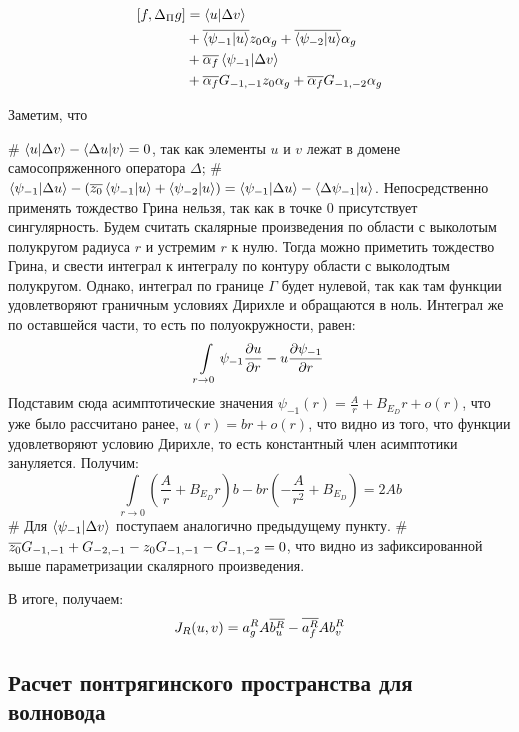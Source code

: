 \begin{align*}
\iip{f}{\Delta_\Pi  g}
&= \ip{u}{\Delta v} \\
&+ \cconj{\ip{\psi_{-1}}{u}} z_0 \alpha_g + \cconj{\ip{\psi_{-2}}{u}} \alpha_g \\
&+ \cconj{\alpha_f} \ip{\psi_{-1}}{\Delta v} \\
&+ \cconj{\alpha_f} G_{-1, -1} z_0 \alpha_g + \cconj{\alpha_f} G_{-1, -2} \alpha_g 
\end{align*}

Заметим, что
\begin{elist}
# $\ip{u}{\Delta v} - \ip{\Delta u}{v} = 0$, так как элементы $u$ и $v$ лежат в домене самосопряженного оператора $\Delta$;
# $\ip{\psi_{-1}}{\Delta u} - (\cconj{z_0} \ip{\psi_{-1}}{u} + \ip{\psi_{-2}}{u}) = \ip{\psi_{-1}}{\Delta u} - \ip{\Delta \psi_{-1}}{u}$. Непосредственно применять тождество Грина нельзя, так как в точке $0$ присутствует сингулярность. Будем считать скалярные произведения по области с выколотым полукругом радиуса $r$ и устремим $r$ к нулю. Тогда можно приметить тождество Грина, и свести интеграл к интегралу по контуру области с выколодтым полукругом. Однако, интеграл по границе $\Gamma$ будет нулевой, так как там функции удовлетворяют граничным условиях Дирихле и обращаются в ноль. Интеграл же по оставшейся части, то есть по полуокружности, равен: 
\[
\int\limits_{r \to 0} \psi_{-1} \pdv{u}{r} - u \pdv{\psi_{-1}}{r}
\]
Подставим сюда асимптотические значения $\psi_{-1}(r) = \frac{A}{r} + B_{E_D} r + o(r)$, что уже было рассчитано ранее, $u(r) = b r + o(r)$, что видно из того, что функции удовлетворяют условию Дирихле, то есть константный член асимптотики зануляется. Получим:
\[
\int\limits_{r \to 0} \left( \frac{A}{r} + B_{E_D} r \right) b - b r \left( -\frac{A}{r^2} + B_{E_D} \right) = 2 A b
\]
# Для $\ip{\psi_{-1}}{\Delta v}$ поступаем аналогично предыдущему пункту.
# $\overline{z_0} G_{-1, -1} + G_{-2, -1} - z_0 G_{-1, -1} - G_{-1, -2} = 0$, что видно из зафиксированной выше параметризации скалярного произведения.
\end{elist}
В итоге, получаем:
\begin{align*}
J_R(u, v) = a^R_g A \overline{b^R_u} - \overline{a^R_f} A b^R_v 
\end{align*}

\subsection{Расчет понтрягинского пространства для волновода}
